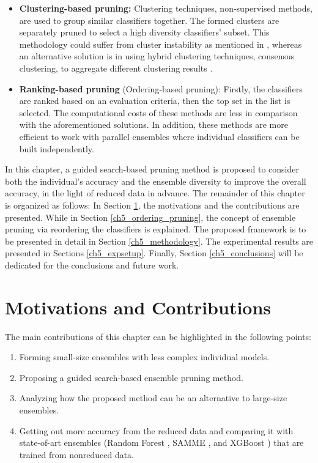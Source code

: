 \begin{itemize}[noitemsep]
    \item \textbf{Clustering-based pruning:} Clustering techniques, non-supervised methods, are used to group similar classifiers together. The formed clusters are separately pruned to select a high diversity classifiers' subset. This methodology could suffer from cluster instability as mentioned in \cite{lin2014}, whereas an alternative solution is in using hybrid clustering techniques, consensus clustering, to aggregate different clustering results \cite{onan2017,ghosh2011}.    
       \item \textbf{Ranking-based pruning} (Ordering-based pruning): Firstly, the classifiers are ranked based on an evaluation criteria, then the top set in the list is selected. The computational costs of these methods are less in comparison with the aforementioned solutions. In addition, these methods are more efficient to work with parallel ensembles where individual classifiers can be built independently.
 \end{itemize}
 
 
 In this chapter, a guided search-based pruning method is proposed to consider both the individual's accuracy and the ensemble diversity to improve the overall accuracy, in the light of reduced data in advance. The remainder of this chapter is organized as follows: In Section \ref{ch5_motivations},
the motivations and the contributions are presented. While in Section \ref{ch5_ordering_pruning}, the concept of ensemble pruning via reordering the classifiers is explained. The proposed framework is to be presented in detail in Section \ref{ch5_methodology}. The experimental results are presented in Sections \ref{ch5_expsetup}. Finally, Section \ref{ch5_conclusions}  will be dedicated for the conclusions and future work.



\section{Motivations and Contributions} \label{ch5_motivations}
The main contributions of this chapter can be highlighted in the following points:

\begin{enumerate}[nosep]
    \item  Forming small-size ensembles with less complex individual models.
    \item  Proposing a guided search-based ensemble pruning method.
     \item Analyzing how the proposed method can be an alternative to large-size ensembles.
    
    \item Getting out more accuracy from the reduced data and comparing it with state-of-art ensembles (Random Forest \cite{breiman2001}, SAMME \citep{hastie2009}, and XGBoost \citep{chen2016}) that are trained from nonreduced data. 
\end{enumerate}

